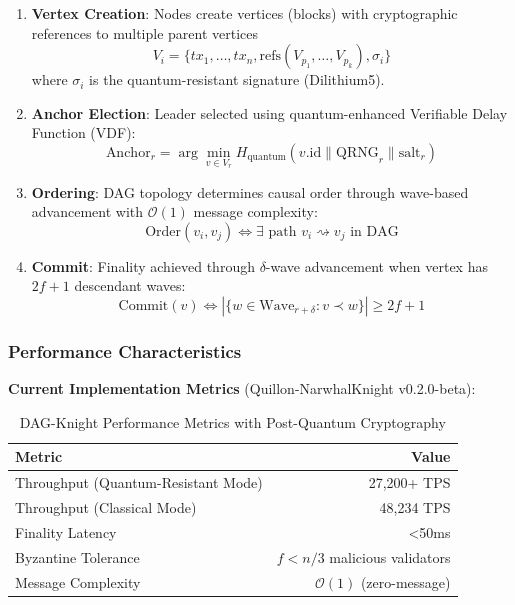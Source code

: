 \documentclass[11pt,a4paper]{article}
\begin{document}
\begin{tcolorbox}[colback=quantumblue!10,colframe=quantumblue,title=\textbf{DAG-Knight Consensus Phases}]
\begin{enumerate}
    \item \textbf{Vertex Creation}: Nodes create vertices (blocks) with cryptographic references to multiple parent vertices
    \begin{equation}
    V_i = \{tx_1, \ldots, tx_n, \text{refs}(V_{p_1}, \ldots, V_{p_k}), \sigma_i\}
    \end{equation}
    where $\sigma_i$ is the quantum-resistant signature (Dilithium5).

    \item \textbf{Anchor Election}: Leader selected using quantum-enhanced Verifiable Delay Function (VDF):
    \begin{equation}
    \text{Anchor}_r = \arg\min_{v \in V_r} H_{\text{quantum}}(v.\text{id} \parallel \text{QRNG}_r \parallel \text{salt}_r)
    \end{equation}

    \item \textbf{Ordering}: DAG topology determines causal order through wave-based advancement with $\mathcal{O}(1)$ message complexity:
    \begin{equation}
    \text{Order}(v_i, v_j) \iff \exists \text{ path } v_i \rightsquigarrow v_j \text{ in DAG}
    \end{equation}

    \item \textbf{Commit}: Finality achieved through $\delta$-wave advancement when vertex has $2f+1$ descendant waves:
    \begin{equation}
    \text{Commit}(v) \iff |\{w \in \text{Wave}_{r+\delta} : v \prec w\}| \geq 2f+1
    \end{equation}
\end{enumerate}
\end{tcolorbox}

\subsubsection{Performance Characteristics}

\textbf{Current Implementation Metrics} (Quillon-NarwhalKnight v0.2.0-beta):

\begin{table}[H]
\centering
\begin{tabular}{|l|r|}
\hline
\textbf{Metric} & \textbf{Value} \\
\hline
Throughput (Quantum-Resistant Mode) & 27,200+ TPS \\
Throughput (Classical Mode) & 48,234 TPS \\
Finality Latency & <50ms \\
Byzantine Tolerance & $f < n/3$ malicious validators \\
Message Complexity & $\mathcal{O}(1)$ (zero-message) \\
\hline
\end{tabular}
\caption{DAG-Knight Performance Metrics with Post-Quantum Cryptography}
\label{tab:dag-knight-performance}
\end{table}
\end{document}

